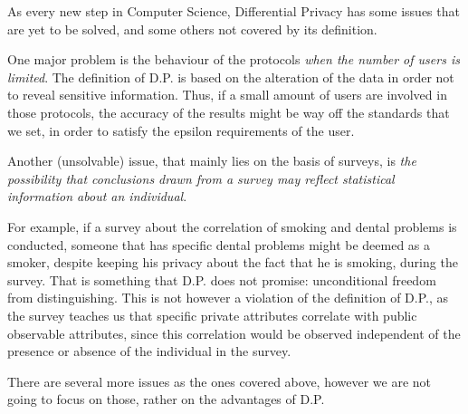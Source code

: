 As every new step in Computer Science, Differential Privacy has some issues that are yet to be solved, and some others not covered by its definition. 

One major problem is the behaviour of the protocols \emph{when the number of users is limited}. The definition of D.P. is based on the alteration of the data in order not to reveal sensitive information. Thus, if a small amount of users are involved in those protocols, the accuracy of the results might be way off the standards that we set, in order to satisfy the epsilon requirements of the user.

Another (unsolvable) issue, that mainly lies on the basis of surveys, is  \emph{the possibility that conclusions drawn from a survey may reflect statistical information about an individual}.

For example, if a survey about the correlation of smoking and dental problems is conducted, someone that has specific dental problems might be deemed as a smoker, despite keeping his privacy about the fact that he is smoking, during the survey. That is something that D.P. does not promise: unconditional freedom from distinguishing. This is not however a violation of the definition of D.P., as the survey teaches us that specific private attributes correlate with public observable attributes, since this correlation would be observed independent of the presence or absence of the individual in the survey.

There are several more issues as the ones covered above, however we are not going to focus on those, rather on the advantages of D.P.